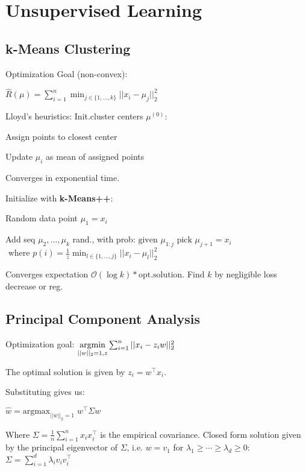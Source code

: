 \section*{Unsupervised Learning}



\subsection*{k-Means Clustering}

Optimization Goal (non-convex):

\qquad $\hat{R} (\mu) = \sum_{i=1}^n \min_{j\in \{1,\ldots,k\}} ||x_i - \mu_j||_2^2$

Lloyd's heuristics:
Init.cluster centers $\mu^{(0)}$:
\begin{compactitem}
	\item Assign points to closest center				
	\item Update $\mu_i$ as mean of assigned points
\end{compactitem}

Converges in exponential time.

Initialize with \textbf{k-Means++}:

\begin{compactitem}
	\item Random data point $\mu_1 = x_i$
	\item Add seq $\mu_2, \ldots ,\mu_k$ rand., with prob:
		$\text{given } \mu_{1:j} \text{ pick } \mu_{j+1} = x_i$ 
		$\text{ where } p(i) = \frac{1}{z} \min_{l \in \{1,\ldots,j\}} ||x_i - \mu_l||_2^2$
\end{compactitem}
Converges expectation $\mathcal O (\log k) * \text{opt.solution}$.
Find $k$ by negligible loss decrease or reg.

\subsection*{Principal Component Analysis}

Optimization goal:
$\underset{||w||_2 = 1, z}{\text{argmin}} \sum_{i=1}^n ||x_i - z_i w||_2^2$

The optimal solution is given by $z_i = w^\top x_i$.  

Substituting gives us:

\qquad \qquad $\hat{w} = \text{argmax}_{||w||_2=1} \; w^\top \Sigma w$

Where $\Sigma = \frac{1}{n} \sum_{i=1}^n x_i x_i^\top$ is the empirical covariance. Closed form solution given by the principal eigenvector of $\Sigma$, i.e. $w = v_1$ for $\lambda_1 \geq \cdots \geq \lambda_d \geq 0$:
$\Sigma = \sum_{i=1}^d \lambda_i v_i v_i^\top$


